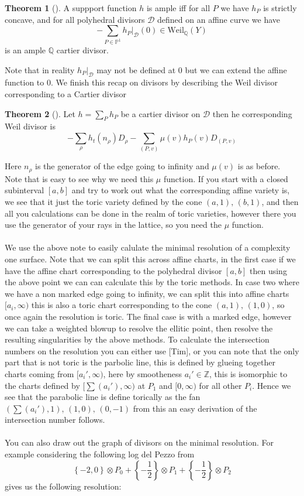 \documentclass[11pt]{amsart}
\theoremstyle{definition}
\newtheorem{thm}{Theorem}[section]
\theoremstyle{definition}
\theoremstyle{definition}
\theoremstyle{definition}
\theoremstyle{definition}
\theoremstyle{definition}
\theoremstyle{definition}
\begin{document}
\begin{thm}[\cite{PS}]
A suppport function $h$ is ample iff for all $P$ we have $h_P$ is strictly concave, and for all polyhedral divisors $\mathcal{D}$ defined on an affine curve we have
\[
- \sum_{P \in \mathbb{P}^1} h_P |_\mathcal{D} (0) \in \text{Weil}_\mathbb{Q} (Y)
\]
 is an ample $\mathbb{Q}$ cartier divisor.
\end{thm}
Note that in reality $h_P |_\mathcal{D}$ may not be defined at $0$ but we can extend the affine function to $0$. We finish this recap on divisors by describing the Weil divisor corresponding to a Cartier divisor
\begin{thm}[\cite{PS}]
Let $h = \sum_P h_P$ be a cartier divisor on $\mathcal{D}$ then he corresponding Weil divisor is 
\[
- \sum_\rho h_t ( n_\rho) D_\rho - \sum_{(P, v)} \mu(v) h_P(v) D_{(P,v)}
\]
\end{thm}
Here $n_\rho$ is the generator of the edge going to infinity and $\mu(v)$ is as before. Note that is easy to see why we need this $\mu$ function. If you start with a closed subinterval $[a, b]$ and try to work out what the corresponding affine variety is, we see that it just the toric variety defined by the cone $(a,1), \, (b,1)$, and then all you calculations can be done in the realm of toric varieties, however there you use the generator of your rays in the lattice, so you need the $\mu$ function.
\\
\\
We use the above note to easily calulate the minimal resolution of a complexity one surface. Note that we can split this across affine charts, in the first case if we have the affine chart corresponding to the polyhedral divisor $[a,b]$ then using the above point we can can calculate this by the toric methods. In case two where we have a non marked edge going to infinity, we can split this into affine charts $[a_i, \infty)$ this is also a toric chart corresponding to the cone $(a,1), \, (1,0)$, so once again the resolution is toric. The final case is with a marked edge, however we can take a weighted blowup to resolve the ellitic point, then resolve the resulting singularities by the above methods. To calculate the intersection numbers on the resolution you can either use [Tim], \cite{PS} or you can note that the only part that is not toric is the parbolic line, this is defined by glueing together charts coming from $[a_i', \infty)$, here by smootheness $a_i' \in \mathbb{Z}$, this is isomorphic to the charts defined by $[\sum(a_i'), \infty)$ at $P_1$ and $[0, \infty)$ for all other $P_i$. Hence we see that the parabolic line is define torically as the fan  
$(\sum(a_i'), 1), \, (1, 0), \,(0, -1)$ from this an easy derivation of the intersection number follows.
\\
\\
You can also draw out the graph of divisors on the minimal resolution. For example considering the following log del Pezzo from \cite{S}
\[
\left\{-2, 0 \right\} \otimes P_0 + \left\{-\frac{1}{2} \right\} \otimes P_1 + \left\{ -\frac{1}{2} \right\} \otimes P_2 
\]
gives us the following resolution:
\end{document}
